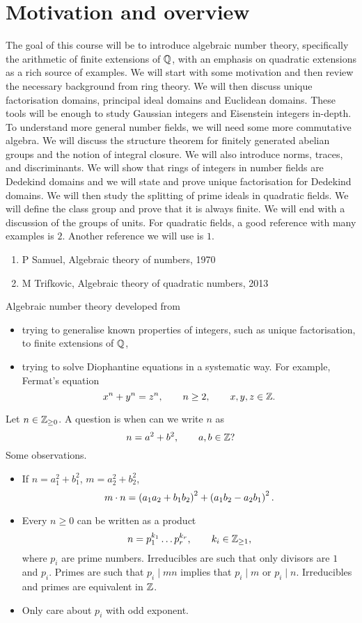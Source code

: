 





\section{Motivation and overview}


The goal of this course will be to introduce algebraic number theory, specifically the arithmetic of finite extensions of $ \mathbb{Q} $, with an emphasis on quadratic extensions as a rich source of examples. We will start with some motivation and then review the necessary background from ring theory. We will then discuss unique factorisation domains, principal ideal domains and Euclidean domains. These tools will be enough to study Gaussian integers and Eisenstein integers in-depth. To understand more general number fields, we will need some more commutative algebra. We will discuss the structure theorem for finitely generated abelian groups and the notion of integral closure. We will also introduce norms, traces, and discriminants. We will show that rings of integers in number fields are Dedekind domains and we will state and prove unique factorisation for Dedekind domains. We will then study the splitting of prime ideals in quadratic fields. We will define the class group and prove that it is always finite. We will end with a discussion of the groups of units. For quadratic fields, a good reference with many examples is $ 2 $. Another reference we will use is $ 1 $.
\begin{enumerate}
\item P Samuel, Algebraic theory of numbers, 1970
\item M Trifkovic, Algebraic theory of quadratic numbers, 2013
\end{enumerate}
Algebraic number theory developed from
\begin{itemize}
\item trying to generalise known properties of integers, such as unique factorisation, to finite extensions of $ \mathbb{Q} $,
\item trying to solve Diophantine equations in a systematic way. For example, Fermat's equation
$$ x^n + y^n = z^n, \qquad n \ge 2, \qquad x, y, z \in \mathbb{Z}. $$
\end{itemize}
Let $ n \in \mathbb{Z}_{\ge 0} $. A question is when can we write $ n $ as
$$ n = a^2 + b^2, \qquad a, b \in \mathbb{Z}? $$
Some observations.
\begin{itemize}
\item If $ n = a_1^2 + b_1^2 $, $ m = a_2^2 + b_2^2 $,
$$ m \cdot n = \br{a_1a_2 + b_1b_2}^2 + \br{a_1b_2 - a_2b_1}^2. $$
\item Every $ n \ge 0 $ can be written as a product
$$ n = p_1^{k_1} \dots p_r^{k_r}, \qquad k_i \in \mathbb{Z}_{\ge 1}, $$
where $ p_i $ are prime numbers. Irreducibles are such that only divisors are $ 1 $ and $ p_i $. Primes are such that $ p_i \mid mn $ implies that $ p_i \mid m $ or $ p_i \mid n $. Irreducibles and primes are equivalent in $ \mathbb{Z} $.
\item Only care about $ p_i $ with odd exponent.
\end{itemize}
